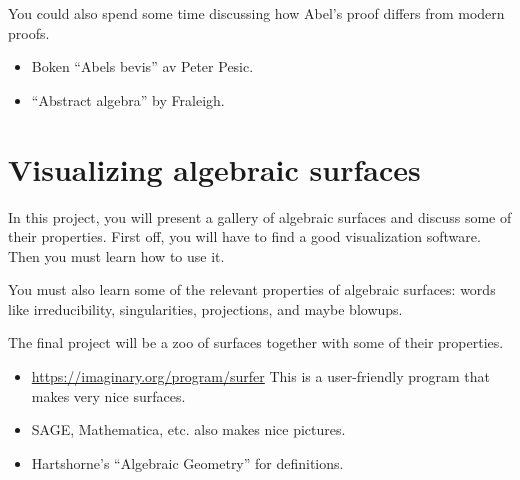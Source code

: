 \documentclass[11pt, english, a4paper]{article}
\begin{document}
You could also spend some time discussing how Abel's proof differs from modern proofs. 

\begin{itemize}
\item Boken ``Abels bevis'' av Peter Pesic.
\item ``Abstract algebra'' by Fraleigh.
\end{itemize}

\section{Visualizing algebraic surfaces}

In this project, you will present a gallery of algebraic surfaces and discuss some of their properties. First off, you will have to find a good visualization software. Then you must learn how to use it.

You must also learn some of the relevant properties of algebraic surfaces: words like irreducibility, singularities, projections, and maybe blowups.

The final project will be a zoo of surfaces together with some of their properties. 

\begin{itemize}
\item \url{https://imaginary.org/program/surfer} This is a user-friendly program that makes very nice surfaces.
\item SAGE, Mathematica, etc. also makes nice pictures.
\item Hartshorne's ``Algebraic Geometry'' for definitions.
\end{itemize}
\end{document}
